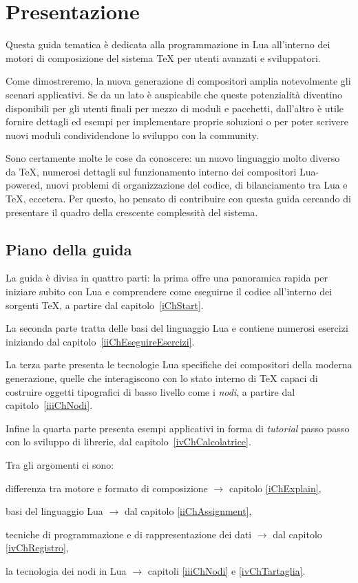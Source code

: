 

\chapter{Presentazione}

Questa guida tematica è dedicata alla programmazione in Lua all'interno dei
motori di composizione del sistema \TeX{} per utenti avanzati e sviluppatori.

Come dimostreremo, la nuova generazione di compositori amplia notevolmente gli
scenari applicativi. Se da un lato è auspicabile che queste potenzialità
diventino disponibili per gli utenti finali per mezzo di moduli e pacchetti,
dall'altro è utile fornire dettagli ed esempi per implementare proprie soluzioni
o per poter scrivere nuovi moduli condividendone lo sviluppo con la community.

Sono certamente molte le cose da conoscere: un nuovo linguaggio molto diverso da
\TeX{}, numerosi dettagli sul funzionamento interno dei compositori Lua-powered,
nuovi problemi di organizzazione del codice, di bilanciamento tra Lua e \TeX,
eccetera. Per questo, ho pensato di contribuire con questa guida cercando di
presentare il quadro della crescente complessità del sistema.


\section{Piano della guida}

La guida è divisa in quattro parti: la prima offre una panoramica rapida per
iniziare subito con Lua e comprendere come eseguirne il codice all'interno dei
sorgenti \TeX{}, a partire dal capitolo~\ref{iChStart}.

La seconda parte tratta delle basi del linguaggio Lua e contiene numerosi
esercizi iniziando dal capitolo~\ref{iiChEseguireEsercizi}.

La terza parte presenta le tecnologie Lua specifiche dei compositori della
moderna generazione, quelle che interagiscono con lo stato interno di \TeX{}
capaci di costruire oggetti tipografici di basso livello come i \emph{nodi}, a
partire dal capitolo~\ref{iiiChNodi}.

Infine la quarta parte presenta esempi applicativi in forma di \emph{tutorial}
passo passo con lo sviluppo di librerie, dal capitolo~\ref{ivChCalcolatrice}.

Tra gli argomenti ci sono:
\begin{compactitemize}
\item differenza tra motore e formato di composizione \( \to \) capitolo
\ref{iChExplain},
\item basi del linguaggio Lua \( \to \) dal capitolo \ref{iiChAssignment},
\item tecniche di programmazione e di rappresentazione dei dati \( \to \) dal
capitolo \ref{ivChRegistro},
\item la tecnologia dei nodi in Lua \( \to \) capitoli \ref{iiiChNodi} e
\ref{ivChTartaglia}.
\end{compactitemize}



